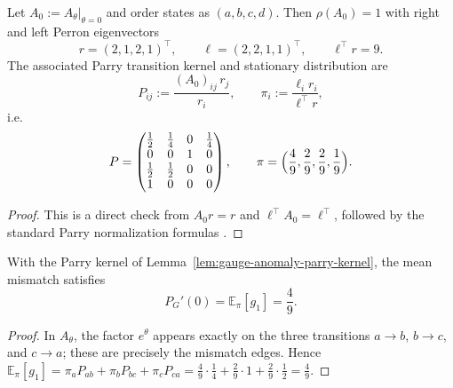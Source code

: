 \begin{lemma}[Parry normalization at $\theta=0$]\label{lem:gauge-anomaly-parry-kernel}
Let $A_0:=A_\theta|_{\theta=0}$ and order states as $(a,b,c,d)$.
Then $\rho(A_0)=1$ with right and left Perron eigenvectors
\[
r=(2,1,2,1)^\top,\qquad \ell=(2,2,1,1)^\top,\qquad \ell^\top r=9.
\]
The associated Parry transition kernel and stationary distribution are
\[
P_{ij}:=\frac{(A_0)_{ij}\,r_j}{r_i},\qquad \pi_i:=\frac{\ell_i r_i}{\ell^\top r},
\]
i.e.
\[
P=\begin{pmatrix}\frac12&\frac14&0&\frac14\\0&0&1&0\\\frac12&\frac12&0&0\\1&0&0&0\end{pmatrix},
\qquad
\pi=\Bigl(\frac49,\frac29,\frac29,\frac19\Bigr).
\]
\end{lemma}
\begin{proof}
This is a direct check from $A_0r=r$ and $\ell^\top A_0=\ell^\top$, followed by the standard Parry normalization formulas \cite[Chapter~4]{LindMarcus1995}.
\end{proof}

\begin{corollary}\label{cor:gauge-anomaly-mean-edge}
With the Parry kernel of Lemma~\ref{lem:gauge-anomaly-parry-kernel}, the mean mismatch satisfies
\[
P_G'(0)=\mathbb E_\pi[g_1]=\frac49.
\]
\end{corollary}
\begin{proof}
In $A_\theta$, the factor $e^\theta$ appears exactly on the three transitions $a\to b$, $b\to c$, and $c\to a$; these are precisely the mismatch edges.
Hence $\mathbb E_\pi[g_1]=\pi_a P_{ab}+\pi_b P_{bc}+\pi_c P_{ca}=\frac49\cdot\frac14+\frac29\cdot 1+\frac29\cdot\frac12=\frac49$.
\end{proof}

